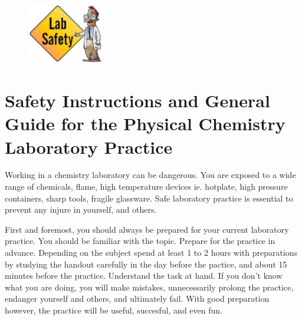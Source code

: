 \fancyhead[LO,RE]{\thesection}
\fancyfoot[LE,RO]{\thepage}

\begin{figure}
  \centering
  \includegraphics[width=0.3\textwidth]{fig/labsafety.jpg}
\end{figure}

\section{Safety Instructions and General Guide for the Physical Chemistry Laboratory Practice}

Working in a chemistry laboratory can be dangerous. You are exposed to a wide range of chemicals, flame, high temperature devices ie. hotplate, high pressure containers, sharp tools, fragile glassware. Safe laboratory practice is essential to prevent any injure in yourself, and others.

First and foremost, you should always be prepared for your current laboratory practice. You should be familiar with the topic. Prepare for the practice in advance. Depending on the subject spend at least 1 to 2 hours with preparations by studying the handout carefully in the day before the pactice, and about 15 minutes before the practice. Understand the task at hand. If you don't know what you are doing, you will make mistakes, unnecessarily prolong the practice, endanger yourself and others, and ultimately fail. With good preparation however, the practice will be useful, succesful, and even fun.

